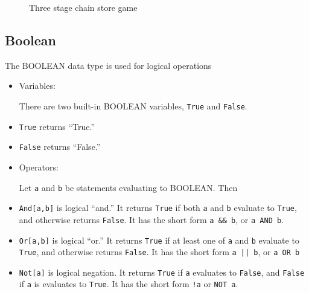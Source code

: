 \newpage
\begin{figure}[h]
\centerline{}
\caption{Three stage chain store game}
\end{figure}


\subsection{Boolean}

The BOOLEAN data type is used for logical operations

\begin{itemize}
\item
Variables:

There are two built-in BOOLEAN variables, \verb+True+  and \verb+False+.  

\bd
\item
\verb+True+ returns ``True.''

\item
\verb+False+ returns ``False.''
\ed

\item
Operators:

Let \verb+a+ and \verb+b+ be statements evaluating to BOOLEAN. Then  

\bd
\item
\verb+And[a,b]+ is logical ``and.''  It returns \verb+True+ if
both \verb+a+ and \verb+b+ evaluate to \verb+True+, and otherwise
returns \verb+False+.  It has the short form \verb+a && b+, or
\verb+a AND b+. 

\item
\verb+Or[a,b]+ is logical ``or.''  It returns \verb+True+ if
at least one of \verb+a+ and \verb+b+ evaluate to \verb+True+, and otherwise
returns \verb+False+. It has the short form \verb+a || b+, 
or \verb+a OR b+

\item
\verb+Not[a]+ is logical negation.  It returns \verb+True+ if \verb+a+
evaluates to \verb+False+, and \verb+False+ if \verb+a+ is evaluates
to \verb+True+.  It has the short form \verb+!a+ or \verb+NOT a+.
\ed 
\end{itemize}

